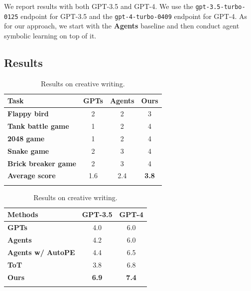 \documentclass{article}
\newcommand{\baby}{agent symbolic learning\xspace}
\begin{document}
We report results with both GPT-3.5 and GPT-4. We use the \texttt{gpt-3.5-turbo-0125} endpoint for GPT-3.5 and the \texttt{gpt-4-turbo-0409} endpoint for GPT-4. As for our approach, we start with the \textbf{Agents} baseline and then conduct \baby on top of it.





\subsection{Results}



\begin{table}[htb]
  \centering
  \begin{minipage}{.45\linewidth}
      \caption{Results on software development.}
      \label{tab:software}
      \begin{tabular}{l|ccc} 
      \Xhline{1.5pt}
      \textbf{Task} & \textbf{GPTs} & \textbf{Agents} & \textbf{Ours} \\
      \hline
      \bf Flappy bird & 2 & 2 & 3 \\
      \bf Tank battle game & 1 & 2 & 4 \\
      \bf 2048 game & 1 & 2 & 4 \\
      \bf Snake game & 2 & 3 & 4 \\
      \bf Brick breaker game & 2 & 3 & 4\\ \hline
      \bf Average score & 1.6 & 2.4 & \bf 3.8 \\
      \Xhline{1.5pt}
      \end{tabular}
  \end{minipage}
  \hfill
  \begin{minipage}{.45\linewidth}
      \caption{Results on creative writing.}
      \label{tab:writing}
      \begin{tabular}{l|cc} 
      \Xhline{1.5pt}
      \textbf{Methods} & \textbf{GPT-3.5} & \textbf{GPT-4} \\
      \hline
      \bf GPTs & 4.0 & 6.0 \\
      \bf Agents & 4.2 & 6.0 \\
      \bf Agents w/ AutoPE & 4.4 & 6.5 \\
      \bf ToT & 3.8 & 6.8 \\ \hline
      \bf Ours & \bf 6.9 &  \bf 7.4 \\
      \Xhline{1.5pt}
      \end{tabular}
  \end{minipage}
\end{table}
  \vspace{-15pt}
\end{document}
